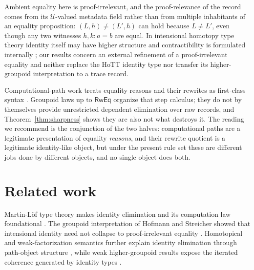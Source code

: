 \documentclass[10pt,reqno]{amsart}
\newcommand{\U}{\mathcal U}
\begin{document}
Ambient equality here is proof-irrelevant, and the proof-relevance of the record
comes from its \(\U\)-valued metadata field rather than from multiple
inhabitants of an equality proposition: \((L,h)\ne(L',h)\) can hold because
\(L\ne L'\), even though any two witnesses \(h,k:a=b\) are equal.  In
intensional homotopy type theory identity itself may have higher structure and
contractibility is formulated internally \cite{HoTTBook2013}; our results
concern an external refinement of a proof-irrelevant equality and neither
replace the HoTT identity type nor transfer its higher-groupoid interpretation
to a trace record.

Computational-path work treats equality reasons and their rewrites as
first-class syntax
\cite{deQueirozEtAl2016,RamosEtAl2017,RamosEtAl2018,deVerasEtAl2025,
RamosEtAl2026}.  Groupoid laws up to \(\mathsf{RwEq}\) organize that step
calculus; they do not by themselves provide unrestricted dependent elimination
over raw records, and Theorem~\ref{thm:sharpness} shows they are also not what
destroys it.  The reading we recommend is the conjunction of the two halves:
computational paths are a legitimate presentation of equality \emph{reasons},
and their rewrite quotient is a legitimate identity-like object, but under the
present rule set these are different jobs done by different objects, and no
single object does both.

\section{Related work}
\label{sec:related}

Martin-L\"of type theory makes identity elimination and its computation law
foundational \cite{MartinLof1984}.  The groupoid interpretation of
Hofmann and Streicher showed that intensional identity need not collapse to
proof-irrelevant equality \cite{HofmannStreicher1998}.  Homotopical and
weak-factorization semantics further explain identity elimination through
path-object structure \cite{AwodeyWarren2009,GambinoGarner2008}, while weak
higher-groupoid results expose the iterated coherence generated by identity
types \cite{Lumsdaine2010,vanDenBergGarner2011}.
\end{document}
